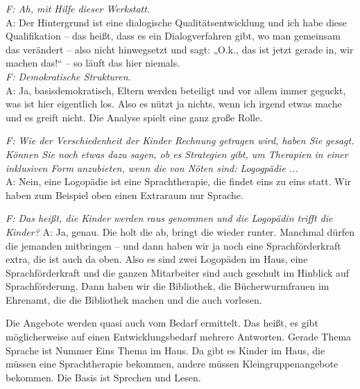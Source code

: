 \begin{linenumbers*}
\emph{F: Ah, mit Hilfe dieser Werkstatt.}\\ 
A: Der Hintergrund ist eine dialogische Qualitätsentwicklung und ich habe diese Qualifikation -- das heißt, dass es ein Dialogverfahren gibt, wo man gemeinsam das verändert -- also nicht hinwegsetzt und sagt: „O.k., das ist jetzt gerade in, wir machen das!“ -- so läuft das hier niemals.\\
\emph{F: Demokratische Strukturen.}\\
A: Ja, basisdemokratisch, Eltern werden beteiligt und vor allem immer geguckt, was ist hier eigentlich los. Also es nützt ja nichts, wenn ich irgend etwas mache und es greift nicht. Die Analyse spielt eine ganz große Rolle. 

\emph{F: Wie der Verschiedenheit der Kinder Rechnung getragen wird, haben Sie gesagt. Können Sie noch etwas dazu sagen, ob es Strategien gibt, um Therapien in einer inklusiven Form anzubieten, wenn die von Nöten sind: Logogpädie ...}\\
A: Nein, eine Logopädie ist eine Sprachtherapie, die findet eins zu eins statt. Wir haben zum Beispiel oben einen Extraraum nur Sprache.  

\emph{F: Das heißt, die Kinder werden raus genommen und die Logopädin trifft die Kinder?}
A: Ja, genau. Die holt die ab, bringt die wieder runter. Manchmal dürfen die jemanden mitbringen -- und dann haben wir ja noch eine Sprachförderkraft extra, die ist auch da oben.
Also es sind zwei Logopäden im Haus, eine Sprachförderkraft 
und die ganzen Mitarbeiter sind auch geschult im Hinblick auf Sprachförderung. Dann haben wir die Bibliothek, die Bücherwurmfrauen im Ehrenamt, die die Bibliothek machen und die auch vorlesen.

Die Angebote werden quasi auch vom Bedarf ermittelt. Das heißt, es gibt möglicherweise auf einen Entwicklungsbedarf mehrere Antworten. Gerade Thema Sprache ist Nummer Eins Thema im Haus. Da gibt es Kinder im Haus, die müssen eine Sprachtherapie bekommen, andere müssen Kleingruppenangebote bekommen. Die Basis ist Sprechen und Lesen.


\end{linenumbers*}
